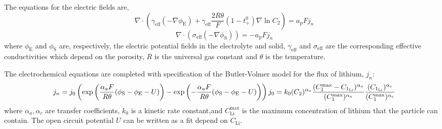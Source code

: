 The equations for the electric fields are, \[ \nabla\cdot\left(\gamma_\text{eff}(-\nabla\phi_\text{E})+\gamma_\text{eff}\frac{2R\theta}{F}(1-t^{0}_{+})\nabla\ln C_{2}\right)=a_\text{p}Fj_{n} \] \[ \nabla\cdot\left(\sigma_\text{eff}(-\nabla\phi_\text{S})\right)=-a_\text{p}Fj_{n} \] where $\phi_\text{E}$ and $\phi_\text{S}$ are, respectively, the electric potential fields in the electrolyte and solid, $\gamma_\text{eff}$ and $\sigma_\text{eff}$ are the corresponding effective conductivities which depend on the porosity, $R$ is the universal gas constant and $\theta$ is the temperature.

The electrochemical equations are completed with specification of the Butler-\/\-Volmer model for the flux of lithium, $j_n$\-: \[ j_n=j_0\left(\text{exp}\left(\frac{\alpha_aF}{R\theta}(\phi_\text{S}-\phi_\text{E}-U)\right)-\text{exp}\left(-\frac{\alpha_aF}{R\theta}(\phi_\text{S}-\phi_\text{E}-U)\right)\right)\\ j_0=k_0(C_2)^{\alpha_a} \frac{(C_1^{\text{max}}-C_{1_\text{Li}})^{\alpha_a}}{(C_1^{\text{max}})^{\alpha_a}} \frac{(C_{1_\text{Li}})^{\alpha_c}}{{(C_1^\text{max}})^{\alpha_c}} \] where $\alpha_a, \alpha_c$ are transfer coefficients, $k_0$ is a kinetic rate constant,and $C^{\text{max}}_\text{Li}$ is the maximum concentration of lithium that the particle can contain. The open circuit potential $U$ can be written as a fit depend on $C_\text{Li}$.

